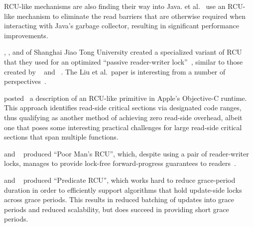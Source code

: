 RCU-like mechanisms are also finding their way into Java.
 et al.~\cite{Sivaramakrishnan:2012:ERB:2258996.2259005}
use an RCU-like mechanism to eliminate the read barriers that are
otherwise required when interacting with Java's garbage collector,
resulting in significant performance improvements.

, , and  of
Shanghai Jiao Tong University
created a specialized variant of RCU that they used for an optimized
``passive reader-writer lock''~\cite{RanLiu2014PassiveRWLock}, similar to
those created by ~\cite{GauthamShenoy2006RCUrwlock} and
~\cite{SrivatsaSBhat2014RCUrwlock}.
The Liu et al.\ paper is interesting from a number of
perspectives~\cite{PaulEMcKenney2014ReadMostly}.

 posted~\cite{MikeAsh2015Apple} a description of an RCU-like
primitive in Apple's Objective-C runtime.
This approach identifies read-side critical sections via designated
code ranges, thus qualifying as another method of achieving
zero read-side overhead, albeit one that poses some interesting
practical challenges for large read-side critical sections that
span multiple functions.

 and ~\cite{PedroRmalhete2015PoorMansRCU}
produced ``Poor Man's RCU'', which, despite using a pair of reader-writer
locks, manages to provide lock-free forward-progress guarantees to
readers~\cite{PaulEMcKenney2015ReadMostly}.

 and ~\cite{Arbel:2015:PRR:2858788.2688518}
produced ``Predicate RCU'', which works hard to reduce grace-period
duration in order to efficiently support algorithms that hold
update-side locks across grace periods.
This results in reduced batching of updates into grace periods
and reduced scalability, but does succeed in providing short
grace periods.

\QuickQuizEnd

